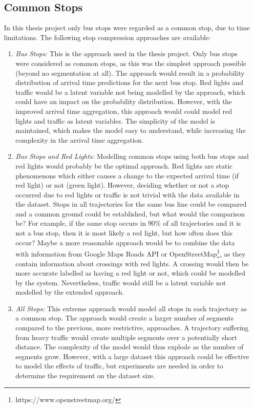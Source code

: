\subsection{Common Stops}
In this thesis project only bus stops were regarded as a common stop, due to time limitations.
The following stop compression approaches are available:
\begin{enumerate}
    \item \textit{Bus Stops:} 
    This is the approach used in the thesis project.
    Only bus stops were considered as common stops, as this was the simplest approach possible (beyond no segmentation at all).
    The approach would result in a probability distribution of arrival time predictions for the next bus stop.
    Red lights and traffic would be a latent variable not being modelled by the approach, which could have an impact on the probability distribution.
    However, with the improved arrival time aggregation, this approach would could model red lights and traffic as latent variables.
    The simplicity of the model is maintained, which makes the model easy to understand, while increasing the complexity in the arrival time aggregation.

    \item \textit{Bus Stops and Red Lights:}
    Modelling common stops using both bus stops and red lights would probably be the optimal approach.
    Red lights are static phenomenons which either causes a change to the expected arrival time (if red light) or not (green light).
    However, deciding whether or not a stop occurred due to red lights or traffic is not trivial with the data available in the dataset.
    Stops in all trajectories for the same bus line could be compared and a common ground could be established, but what would the comparison be?
    For example, if the same stop occurs in 90\% of all trajectories and it is not a bus stop, then it is most likely a red light, but how often does this occur?
    Maybe a more reasonable approach would be to combine the data with information from Google Maps Roads API or OpenStreetMap\footnote{https://www.openstreetmap.org/}, as they contain information about crossings with red lights.
    A crossing would then be more accurate labelled as having a red light or not, which could be modelled by the system.  
    Nevertheless, traffic would still be a latent variable not modelled by the extended approach.
    
    \item \textit{All Stops:}
    This extreme approach would model all stops in each trajectory as a common stop.
    The approach would create a larger number of segments compared to the previous, more restrictive, approaches.
    A trajectory suffering from heavy traffic would create multiple segments over a potentially short distance.
    The complexity of the model would thus explode as the number of segments grow.
    However, with a large dataset this approach could be effective to model the effects of traffic, but experiments are needed in order to determine the requirement on the dataset size. 
\end{enumerate} 

